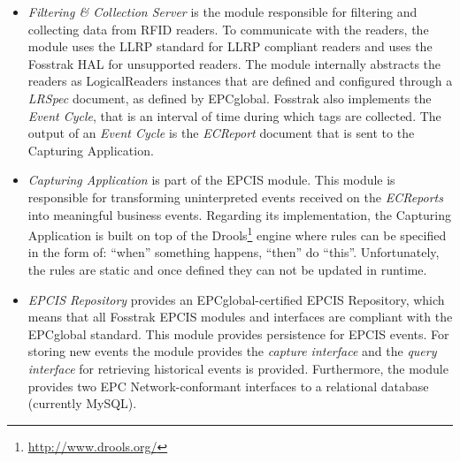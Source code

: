 \begin{itemize}
  \item \textit{Filtering \& Collection Server} is the module responsible for filtering and collecting
  data from \gls{RFID} readers. To communicate with the readers, the module uses the \gls{LLRP} standard
  for \gls{LLRP} compliant readers and uses the Fosstrak \gls{HAL} for unsupported readers. The
  module internally abstracts the readers as LogicalReaders instances that are defined and configured
  through a \textit{LRSpec} document, as defined by EPCglobal. Fosstrak also implements the
  \textit{Event Cycle}, that is an interval of time during which tags are collected. The output of
  an \textit{Event Cycle} is the \textit{ECReport} document that is sent to the Capturing Application.
  \item \textit{Capturing Application} is part of the EPCIS module. This module is responsible for
  transforming uninterpreted events received on the \textit{ECReports} into meaningful business events.
  Regarding its implementation, the Capturing Application is built on top of the Drools\footnote{\url{http://www.drools.org/}}
  engine where rules can be specified in the form of: ``when'' something happens, ``then'' do ``this''.
  Unfortunately, the rules are static and once defined they can not be updated in runtime.
  \item \textit{EPCIS Repository} provides an EPCglobal-certified EPCIS Repository, which means that
  all Fosstrak EPCIS modules and interfaces are compliant with the EPCglobal standard. This module
  provides persistence for \gls{EPCIS} events. For storing new events the module provides the
  \textit{capture interface} and the \textit{query interface} for retrieving historical events is provided.
  Furthermore, the module provides two EPC Network-conformant interfaces to a relational database
  (currently MySQL).
\end{itemize}


